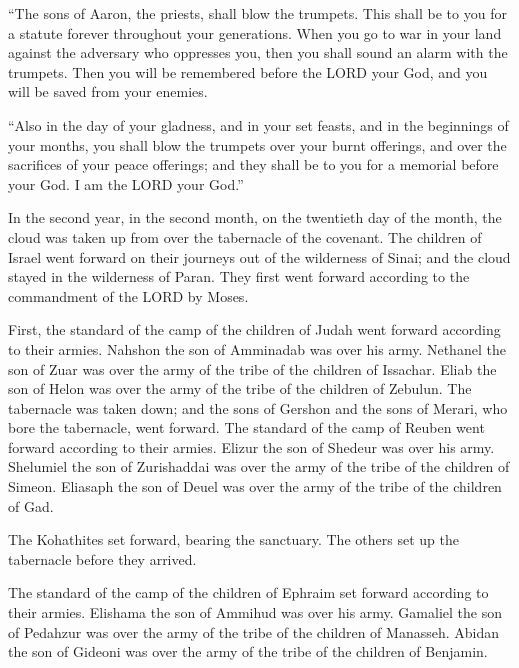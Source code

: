  ``The sons of Aaron, the priests, shall blow the
trumpets. This shall be to you for a statute forever throughout your
generations.  When you go to war in your land against the
adversary who oppresses you, then you shall sound an alarm with the
trumpets. Then you will be remembered before the LORD your God, and you
will be saved from your enemies.

 ``Also in the day of your gladness, and in your set
feasts, and in the beginnings of your months, you shall blow the
trumpets over your burnt offerings, and over the sacrifices of your
peace offerings; and they shall be to you for a memorial before your
God. I am the LORD your God.''

 In the second year, in the second month, on the
twentieth day of the month, the cloud was taken up from over the
tabernacle of the covenant.  The children of Israel went
forward on their journeys out of the wilderness of Sinai; and the cloud
stayed in the wilderness of Paran.  They first went
forward according to the commandment of the LORD by Moses.

 First, the standard of the camp of the children of Judah
went forward according to their armies. Nahshon the son of Amminadab was
over his army.  Nethanel the son of Zuar was over the
army of the tribe of the children of Issachar.  Eliab the
son of Helon was over the army of the tribe of the children of Zebulun.
 The tabernacle was taken down; and the sons of Gershon
and the sons of Merari, who bore the tabernacle, went forward.
 The standard of the camp of Reuben went forward
according to their armies. Elizur the son of Shedeur was over his army.
 Shelumiel the son of Zurishaddai was over the army of
the tribe of the children of Simeon.  Eliasaph the son of
Deuel was over the army of the tribe of the children of Gad.

 The Kohathites set forward, bearing the sanctuary. The
others set up the tabernacle before they arrived.

 The standard of the camp of the children of Ephraim set
forward according to their armies. Elishama the son of Ammihud was over
his army.  Gamaliel the son of Pedahzur was over the army
of the tribe of the children of Manasseh.  Abidan the son
of Gideoni was over the army of the tribe of the children of Benjamin.

